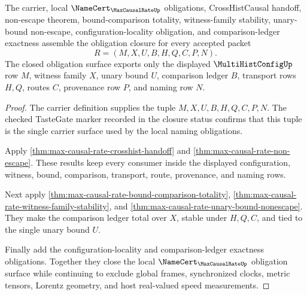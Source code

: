 \begin{theorem}
\label{thm:max-causal-rate-obligation-closure-package}
The carrier, local $\NameCert_{\MaxCausalRateUp}$ obligations, CrossHistCausal handoff, non-escape theorem, bound-comparison totality, witness-family stability, unary-bound non-escape, configuration-locality obligation, and comparison-ledger exactness assemble the obligation closure for every accepted packet
$$
R=(M,X,U,B,H,Q,C,P,N).
$$
The closed obligation surface exports only the displayed $\MultiHistConfigUp$ row $M$, witness family $X$, unary bound $U$, comparison ledger $B$, transport rows $H,Q$, routes $C$, provenance row $P$, and naming row $N$.
\end{theorem}
\begin{proof}
The carrier definition supplies the tuple $M,X,U,B,H,Q,C,P,N$. The checked TasteGate marker recorded in the closure status confirms that this tuple is the single carrier surface used by the local naming obligations.

Apply \autoref{thm:max-causal-rate-crosshist-handoff} and \autoref{thm:max-causal-rate-non-escape}. These results keep every consumer inside the displayed configuration, witness, bound, comparison, transport, route, provenance, and naming rows.

Next apply \autoref{thm:max-causal-rate-bound-comparison-totality}, \autoref{thm:max-causal-rate-witness-family-stability}, and \autoref{thm:max-causal-rate-unary-bound-nonescape}. They make the comparison ledger total over $X$, stable under $H,Q,C$, and tied to the single unary bound $U$.

Finally add the configuration-locality and comparison-ledger exactness obligations. Together they close the local $\NameCert_{\MaxCausalRateUp}$ obligation surface while continuing to exclude global frames, synchronized clocks, metric tensors, Lorentz geometry, and host real-valued speed measurements.
\end{proof}

